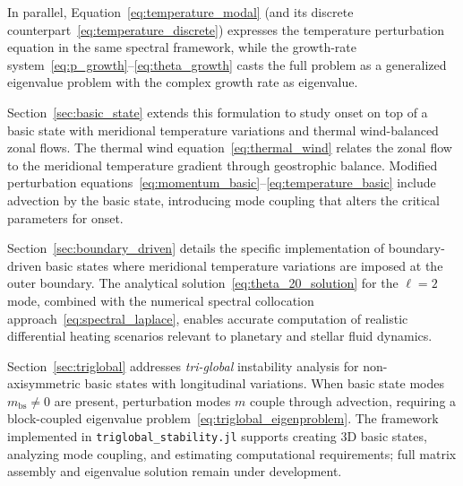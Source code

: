 \documentclass[11pt]{article}
\numberwithin{equation}{section}
\begin{document}
\bigskip
In parallel, Equation~\eqref{eq:temperature_modal} (and its discrete counterpart~\eqref{eq:temperature_discrete}) expresses the temperature perturbation equation in the same spectral framework, while the growth-rate system~\eqref{eq:p_growth}--\eqref{eq:theta_growth} casts the full problem as a generalized eigenvalue problem with the complex growth rate as eigenvalue.

\bigskip
Section~\ref{sec:basic_state} extends this formulation to study onset on top of a basic state with meridional temperature variations and thermal wind-balanced zonal flows. The thermal wind equation~\eqref{eq:thermal_wind} relates the zonal flow to the meridional temperature gradient through geostrophic balance. Modified perturbation equations~\eqref{eq:momentum_basic}--\eqref{eq:temperature_basic} include advection by the basic state, introducing mode coupling that alters the critical parameters for onset.

\bigskip
Section~\ref{sec:boundary_driven} details the specific implementation of boundary-driven basic states where meridional temperature variations are imposed at the outer boundary. The analytical solution~\eqref{eq:theta_20_solution} for the $\ell=2$ mode, combined with the numerical spectral collocation approach~\eqref{eq:spectral_laplace}, enables accurate computation of realistic differential heating scenarios relevant to planetary and stellar fluid dynamics.

\bigskip
Section~\ref{sec:triglobal} addresses \emph{tri-global} instability analysis for non-axisymmetric basic states with longitudinal variations. When basic state modes $m_{\text{bs}}\neq0$ are present, perturbation modes $m$ couple through advection, requiring a block-coupled eigenvalue problem~\eqref{eq:triglobal_eigenproblem}. The framework implemented in \texttt{triglobal\_stability.jl} supports creating 3D basic states, analyzing mode coupling, and estimating computational requirements; full matrix assembly and eigenvalue solution remain under development.
\end{document}
